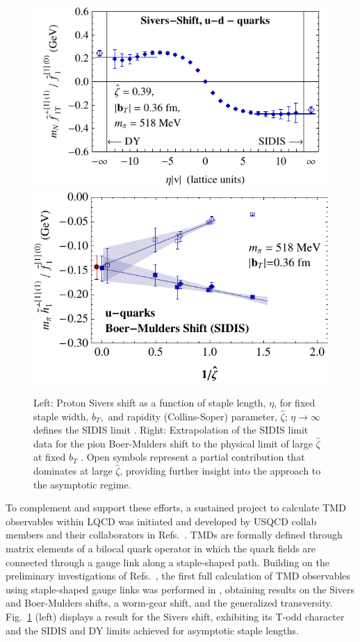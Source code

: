 \begin{figure}[h!]
	\centering
	\includegraphics[width=0.474\columnwidth]{figures/m020_run38_UminusD_Sivers_lsqr-9_zetasqrlat4}\hspace{1cm}
	\includegraphics[width=0.45\columnwidth]{figures/new_bm_u_sidis_b0p36_vszetahat_extrap_pow1}
	\caption{Left: Proton Sivers shift as a function of staple length, $\eta$, for fixed
		staple width, $b_T, $ and rapidity (Collins-Soper) parameter, $\hat{\zeta }$;
		$\eta \rightarrow \infty $ defines the SIDIS limit \cite{Musch:2011er}.
		Right: Extrapolation of the SIDIS limit data for the pion Boer-Mulders
		shift to the physical limit of large $\hat{\zeta }$
		at fixed $b_T $ \cite{Engelhardt:2015xja}. Open symbols represent a partial
		contribution that dominates at large $\hat{\zeta } $, providing further
		insight into the approach to the asymptotic regime.}
	\label{fig_sidis}
\end{figure}

To complement and support these efforts, a sustained
project to calculate TMD observables within LQCD was initiated
and developed by USQCD collab members and their collaborators in Refs.~\cite{Hagler:2009mb,Musch:2010ka,Musch:2011er,Engelhardt:2015xja,Yoon:2017qzo,Engelhardt:2017miy}.
TMDs are formally defined through matrix elements of a bilocal quark
operator in which the quark fields are connected through a gauge link
along a staple-shaped path. Building on the preliminary investigations of Refs.~\cite{Hagler:2009mb,Musch:2010ka}, the first full calculation of TMD
observables using staple-shaped gauge links was performed in
\cite{Musch:2011er}, obtaining results on the Sivers and Boer-Mulders
shifts, a worm-gear shift, and the generalized transversity.
Fig.~\ref{fig_sidis} (left) displays a  result for the Sivers
shift, exhibiting its T-odd character and the SIDIS and DY limits
achieved for asymptotic staple lengths.

